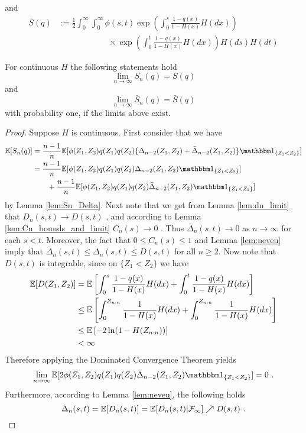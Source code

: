 and 
\begin{align*}
	\bar{S}(q) &:= \frac{1}{2}\int_{0}^{\infty} \int_{0}^{\infty} \phi(s,t)  \exp\left(\int_{0}^{s} \frac{1-q(x)}{1-H(x)} H(dx)\right)\\
	&\qquad\qquad\qquad \times \exp\left(\int_{0}^{t} \frac{1-q(x)}{1-H(x)} H(dx) \right)H(ds)H(dt)
\end{align*}

\begin{lemma}
	For continuous $H$ the following statements hold
	$$\lim\limits_{n\to\infty} S_n(q) = S(q)$$
	and 
	$$\lim\limits_{n\to\infty} \bar{S}_n(q) = \bar{S}(q)$$
	with probability one, if the limits above exist.
	\label{lem:sn_limit}
	\begin{proof}
		Suppose $H$ is continuous. First consider that we have
		\begin{align*}
			\E[S_n(q)] &= \frac{n-1}{n} \E[\phi(Z_1,Z_2)q(Z_1)q(Z_2)\{\Delta_{n-2}(Z_1, Z_2) + \bar\Delta_{n-2}(Z_1, Z_2)\} \I{Z_1<Z_2}]	\\
			&= \frac{n-1}{n} \E[\phi(Z_1,Z_2)q(Z_1)q(Z_2)\Delta_{n-2}(Z_1, Z_2)\I{Z_1<Z_2}]\\
			&\qquad + \frac{n-1}{n} \E[\phi(Z_1,Z_2)q(Z_1)q(Z_2) \bar\Delta_{n-2}(Z_1, Z_2) \I{Z_1<Z_2}]
		\end{align*}
		by Lemma \ref{lem:Sn_Delta}. 
		Next note that we get from Lemma \ref{lem:dn_limit} that $D_n(s,t) \to D(s,t)$ \wpo, and according to Lemma \ref{lem:Cn_bounds_and_limit} $C_n(s) \to 0$ \wpo. Thus $\bar{\Delta}_n(s,t) \to 0$ as $n\to\infty$ for each $s<t$.
		Moreover, the fact that $0\leq C_n(s)\leq 1$ and Lemma \ref{lem:neveu} imply that $\bar{\Delta}_n(s,t) \leq \Delta_n(s,t) \leq D(s,t)$ for all $n\geq 2$. Now note that $D(s,t)$ is integrable, since on $\{Z_1<Z_2\}$ we have
		\begin{align*}
			\mathbb{E}[D(Z_1,Z_2)] &= \mathbb{E}\left[\int_{0}^{s} \frac{1-q(x)}{1-H(x)} H(dx) + \int_{0}^{t} \frac{1-q(x)}{1-H(x)} H(dx)\right]\\
			&\leq \mathbb{E}\left[\int_{0}^{Z_{n:n}} \frac{1}{1-H(x)} H(dx) + \int_{0}^{Z_{n:n}} \frac{1}{1-H(x)} H(dx)\right]\\
			&\leq \mathbb{E}\left[-2\ln(1-H(Z_{n:n}))\right]\\
			& < \infty
		\end{align*}
		Therefore applying the Dominated Convergence Theorem yields
		$$\lim\limits_{n\to\infty}\E[2\phi(Z_1,Z_2)q(Z_1)q(Z_2) \bar\Delta_{n-2}(Z_1, Z_2) \I{Z_1<Z_2}] = 0\mdot$$
		Furthermore, according to Lemma \ref{lem:neveu}, the following holds
		$$\Delta_{n}(s,t) = \mathbb{E}[D_n(s,t)] = \mathbb{E}[D_n(s,t)|\mathcal{F}_\infty] \nearrow D(s,t)\textrm{ .}$$

\end{proof}
\end{lemma}
